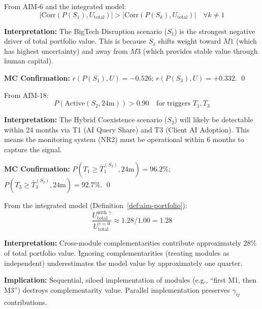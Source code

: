 \begin{proposition}
\label{prop:aim-sensitivity}
From AIM-6 and the integrated model:
\begin{equation}
\left|\text{Corr}(P(S_1), U_{\text{total}})\right| > \left|\text{Corr}(P(S_k), U_{\text{total}})\right|
\quad \forall k \neq 1
\end{equation}

\textbf{Interpretation:} The BigTech Disruption scenario ($S_1$) is the
strongest negative driver of total portfolio value. This is because $S_1$
shifts weight toward $M1$ (which has highest uncertainty) and away from
$M3$ (which provides stable value through human capital).

\textbf{MC Confirmation:} $r(P(S_1), U) = -0.526$;
$r(P(S_3), U) = +0.332$. \qed
\end{proposition}


\begin{proposition}
\label{prop:aim-early-warning}
From AIM-18:
\begin{equation}
P(\text{Active}(S_2, 24\text{m})) > 0.90
\quad \text{for triggers } T_1, T_3
\end{equation}

\textbf{Interpretation:} The Hybrid Coexistence scenario ($S_2$) will likely
be detectable within 24 months via T1 (AI Query Share) and T3 (Client AI
Adoption). This means the monitoring system (NR2) must be operational
within 6 months to capture the signal.

\textbf{MC Confirmation:}
$P(T_1 \geq \bar{T}_1^{(S_2)}, 24\text{m}) = 96.2\%$;
$P(T_3 \geq \bar{T}_3^{(S_2)}, 24\text{m}) = 92.7\%$. \qed
\end{proposition}


\begin{proposition}
\label{prop:aim-comp-premium}
From the integrated model (Definition~\ref{def:aim-portfolio}):
\begin{equation}
\frac{U_{\text{total}}^{\text{with } \gamma}}{U_{\text{total}}^{\gamma = 0}} \approx 1.28 / 1.00 = 1.28
\end{equation}

\textbf{Interpretation:} Cross-module complementarities contribute approximately
28\% of total portfolio value. Ignoring complementarities (treating modules
as independent) underestimates the model value by approximately one quarter.

\textbf{Implication:} Sequential, siloed implementation of modules
(e.g., ``first M1, then M3'') destroys complementarity value.
Parallel implementation preserves $\gamma_{ij}$ contributions.
\end{proposition}


